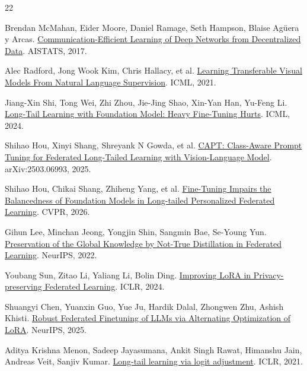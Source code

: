 \documentclass[10pt,twocolumn,letterpaper]{article}
\begin{document}
\begin{thebibliography}{22}

Brendan McMahan, Eider Moore, Daniel Ramage, Seth Hampson, Blaise Agüera y Arcas. \href{https://proceedings.mlr.press/v54/mcmahan17a.html}{Communication-Efficient Learning of Deep Networks from Decentralized Data}. AISTATS, 2017.

Alec Radford, Jong Wook Kim, Chris Hallacy, et al. \href{https://proceedings.mlr.press/v139/radford21a.html}{Learning Transferable Visual Models From Natural Language Supervision}. ICML, 2021.

Jiang-Xin Shi, Tong Wei, Zhi Zhou, Jie-Jing Shao, Xin-Yan Han, Yu-Feng Li. \href{https://proceedings.mlr.press/v235/shi24g.html}{Long-Tail Learning with Foundation Model: Heavy Fine-Tuning Hurts}. ICML, 2024.

Shihao Hou, Xinyi Shang, Shreyank N Gowda, et al. \href{https://arxiv.org/abs/2503.06993}{CAPT: Class-Aware Prompt Tuning for Federated Long-Tailed Learning with Vision-Language Model}. arXiv:2503.06993, 2025.

Shihao Hou, Chikai Shang, Zhiheng Yang, et al. \href{https://openaccess.thecvf.com/content/CVPR2026/html/Hou_Fine-Tuning_Impairs_the_Balancedness_of_Foundation_Models_in_Long-tailed_Personalized_CVPR_2026_paper.html}{Fine-Tuning Impairs the Balancedness of Foundation Models in Long-tailed Personalized Federated Learning}. CVPR, 2026.

Gihun Lee, Minchan Jeong, Yongjin Shin, Sangmin Bae, Se-Young Yun. \href{https://proceedings.neurips.cc/paper_files/paper/2022/hash/fadec8f2e65f181d777507d1df69b92f-Abstract-Conference.html}{Preservation of the Global Knowledge by Not-True Distillation in Federated Learning}. NeurIPS, 2022.

Youbang Sun, Zitao Li, Yaliang Li, Bolin Ding. \href{https://proceedings.iclr.cc/paper_files/paper/2024/hash/4e243e95c913b367775d71d7182b99d9-Abstract-Conference.html}{Improving LoRA in Privacy-preserving Federated Learning}. ICLR, 2024.

Shuangyi Chen, Yuanxin Guo, Yue Ju, Hardik Dalal, Zhongwen Zhu, Ashish Khisti. \href{https://proceedings.neurips.cc/paper_files/paper/2025/hash/adf17e7346b6be4c2f2bb40de572e5bc-Abstract-Conference.html}{Robust Federated Finetuning of LLMs via Alternating Optimization of LoRA}. NeurIPS, 2025.

Aditya Krishna Menon, Sadeep Jayasumana, Ankit Singh Rawat, Himanshu Jain, Andreas Veit, Sanjiv Kumar. \href{https://openreview.net/pdf?id=37nvvqkCo5}{Long-tail learning via logit adjustment}. ICLR, 2021.


\end{thebibliography}
\end{document}
